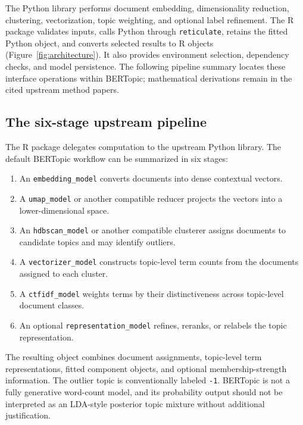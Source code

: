 \documentclass[12pt]{article}
\newcommand{\pkg}[1]{\texttt{#1}}
\newcommand{\code}[1]{\texttt{#1}}
\begin{document}
The Python library performs document embedding, dimensionality reduction, clustering, vectorization, topic weighting, and optional label refinement. The R package validates inputs, calls Python through \pkg{reticulate}, retains the fitted Python object, and converts selected results to R objects (Figure~\ref{fig:architecture}). It also provides environment selection, dependency checks, and model persistence. The following pipeline summary locates these interface operations within BERTopic; mathematical derivations remain in the cited upstream method papers.

\subsection{The six-stage upstream pipeline}

The R package delegates computation to the upstream Python library. The default BERTopic workflow can be summarized in six stages:

\begin{enumerate}
    \item An \code{embedding\_model} converts documents into dense contextual vectors.
    \item A \code{umap\_model} or another compatible reducer projects the vectors into a lower-dimensional space.
    \item An \code{hdbscan\_model} or another compatible clusterer assigns documents to candidate topics and may identify outliers.
    \item A \code{vectorizer\_model} constructs topic-level term counts from the documents assigned to each cluster.
    \item A \code{ctfidf\_model} weights terms by their distinctiveness across topic-level document classes.
    \item An optional \code{representation\_model} refines, reranks, or relabels the topic representation.
\end{enumerate}

The resulting object combines document assignments, topic-level term representations, fitted component objects, and optional membership-strength information. The outlier topic is conventionally labeled \code{-1}. BERTopic is not a fully generative word-count model, and its probability output should not be interpreted as an LDA-style posterior topic mixture without additional justification.
\end{document}
